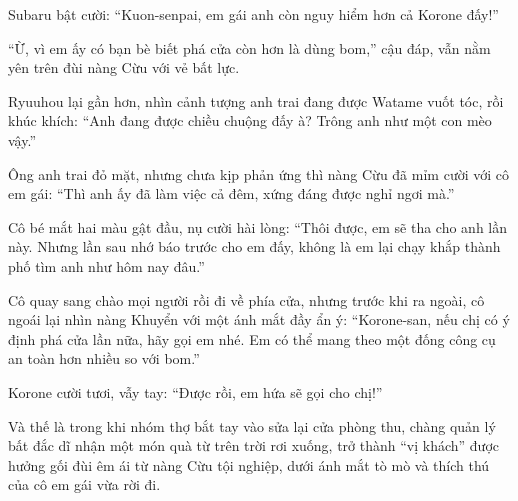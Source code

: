 \documentclass[../main.tex]{subfiles}
\begin{document}
Subaru bật cười: ``Kuon-senpai, em gái anh còn nguy hiểm hơn cả Korone đấy!''

``Ừ, vì em ấy có bạn bè biết phá cửa còn hơn là dùng bom,'' cậu đáp, vẫn nằm yên trên đùi nàng Cừu với vẻ bất lực.

Ryuuhou lại gần hơn, nhìn cảnh tượng anh trai đang được Watame vuốt tóc, rồi khúc khích: ``Anh đang được chiều chuộng đấy à? Trông anh như một con mèo vậy.''

Ông anh trai đỏ mặt, nhưng chưa kịp phản ứng thì nàng Cừu đã mỉm cười với cô em gái: ``Thì anh ấy đã làm việc cả đêm, xứng đáng được nghỉ ngơi mà.''

Cô bé mắt hai màu gật đầu, nụ cười hài lòng: ``Thôi được, em sẽ tha cho anh lần này. Nhưng lần sau nhớ báo trước cho em đấy, không là em lại chạy khắp thành phố tìm anh như hôm nay đâu.''

Cô quay sang chào mọi người rồi đi về phía cửa, nhưng trước khi ra ngoài, cô ngoái lại nhìn nàng Khuyển với một ánh mắt đầy ẩn ý: ``Korone-san, nếu chị có ý định phá cửa lần nữa, hãy gọi em nhé. Em có thể mang theo một đống công cụ an toàn hơn nhiều so với bom.''

Korone cười tươi, vẫy tay: ``Được rồi, em hứa sẽ gọi cho chị!''

Và thế là trong khi nhóm thợ bắt tay vào sửa lại cửa phòng thu, chàng quản lý bất đắc dĩ nhận một món quà từ trên trời rơi xuống, trở thành ``vị khách'' được hưởng gối đùi êm ái từ nàng Cừu tội nghiệp, dưới ánh mắt tò mò và thích thú của cô em gái vừa rời đi.
\end{document}
